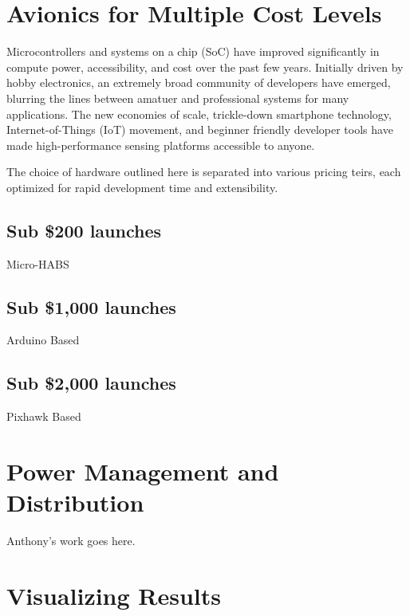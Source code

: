 \documentclass[heading.tex]{subfiles}
\begin{document}
\section{Avionics for Multiple Cost Levels}

Microcontrollers and systems on a chip (SoC) have improved significantly in 
compute power, accessibility, and cost over the past few years.
Initially driven by hobby electronics, an extremely broad community of developers
have emerged, blurring the lines between amatuer and professional systems for
many applications. The new economies of scale, trickle-down smartphone
technology, Internet-of-Things (IoT) movement, and beginner friendly developer
tools have made high-performance sensing platforms accessible to anyone.

The choice of hardware outlined here is separated into various pricing teirs,
each optimized for rapid development time and extensibility.
\subsection{Sub \$200 launches}

Micro-HABS

\subsection{Sub \$1,000 launches}

Arduino Based

\subsection{Sub \$2,000 launches}

Pixhawk Based

\section{Power Management and Distribution}

Anthony's work goes here.

\section{Visualizing Results}
\end{document}
